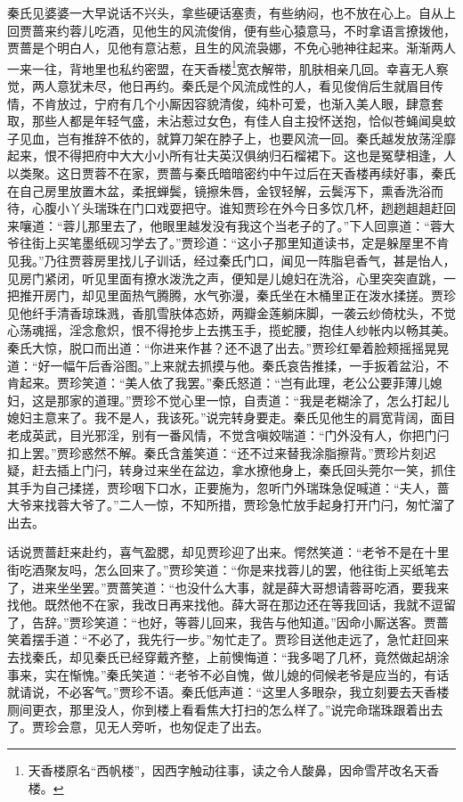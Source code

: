 \documentclass[12pt,oneside]{book}
\begin{document}
秦氏见婆婆一大早说话不兴头，拿些硬话塞责，有些纳闷，也不放在心上。自从上回贾蔷来约蓉儿吃酒，见他生的风流俊俏，便有些心猿意马，不时拿语言撩拨他，贾蔷是个明白人，见他有意沾惹，且生的风流袅娜，不免心驰神往起来。渐渐两人一来一往，背地里也私约密盟，在天香楼\footnote{天香楼原名“西帆楼”，因西字触动往事，读之令人酸鼻，因命雪芹改名天香楼。}宽衣解带，肌肤相亲几回。幸喜无人察觉，两人意犹未尽，他日再约。秦氏是个风流成性的人，看见俊俏后生就眉目传情，不肯放过，宁府有几个小厮因容貌清俊，纯朴可爱，也渐入美人眼，肆意套取，那些人都是年轻气盛，未沾惹过女色，有佳人自主投怀送抱，恰似苍蝇闻臭蚊子见血，岂有推辞不依的，就算刀架在脖子上，也要风流一回。秦氏越发放荡淫靡起来，恨不得把府中大大小小所有壮夫英汉俱纳归石榴裙下。这也是冤孽相逢，人以类聚。这日贾蓉不在家，贾蔷与秦氏暗暗密约中午过后在天香楼再续好事，秦氏在自己房里放置木盆，柔抿蝉鬓，镜擦朱唇，金钗轻解，云鬓泻下，熏香洗浴而待，心腹小丫头瑞珠在门口戏耍把守。谁知贾珍在外今日多饮几杯，趔趔趄趄赶回来嚷道：“蓉儿那里去了，他眼里越发没有我这个当老子的了。”下人回禀道：“蓉大爷往街上买笔墨纸砚习学去了。”贾珍道：“这小子那里知道读书，定是躲屋里不肯见我。”乃往贾蓉房里找儿子训话，经过秦氏门口，闻见一阵脂皂香气，甚是怡人，见房门紧闭，听见里面有撩水泼洗之声，便知是儿媳妇在洗浴，心里突突直跳，一把推开房门，却见里面热气腾腾，水气弥漫，秦氏坐在木桶里正在泼水揉搓。贾珍见他纤手清香琼珠溅，香肌雪肤体态娇，两瓣金莲躺床脚，一袭云纱倚枕头，不觉心荡魂摇，淫念愈炽，恨不得抢步上去携玉手，揽蛇腰，抱佳人纱帐内以畅其美。秦氏大惊，脱口而出道：“你进来作甚？还不退了出去。”贾珍红晕着脸颊摇摇晃晃道：“好一幅午后香浴图。”上来就去抓摸与他。秦氏哀告推揉，一手扳着盆沿，不肯起来。贾珍笑道：“美人依了我罢。”秦氏怒道：“岂有此理，老公公要菲薄儿媳妇，这是那家的道理。”贾珍不觉心里一惊，自责道：“我是老糊涂了，怎么打起儿媳妇主意来了。我不是人，我该死。”说完转身要走。秦氏见他生的肩宽背阔，面目老成英武，目光邪淫，别有一番风情，不觉含嗔姣喘道：“门外没有人，你把门闩扣上罢。”贾珍惑然不解。秦氏含羞笑道：“还不过来替我涂脂擦背。”贾珍片刻迟疑，赶去插上门闩，转身过来坐在盆边，拿水撩他身上，秦氏回头莞尔一笑，抓住其手为自己揉搓，贾珍咽下口水，正要施为，忽听门外瑞珠急促喊道：“夫人，蔷大爷来找蓉大爷了。”二人一惊，不知所措，贾珍急忙放手起身打开门闩，匆忙溜了出去。

话说贾蔷赶来赴约，喜气盈腮，却见贾珍迎了出来。愕然笑道：“老爷不是在十里街吃酒聚友吗，怎么回来了。”贾珍笑道：“你是来找蓉儿的罢，他往街上买纸笔去了，进来坐坐罢。”贾蔷笑道：“也没什么大事，就是薛大哥想请蓉哥吃酒，要我来找他。既然他不在家，我改日再来找他。薛大哥在那边还在等我回话，我就不逗留了，告辞。”贾珍笑道：“也好，等蓉儿回来，我告与他知道。”因命小厮送客。贾蔷笑着摆手道：“不必了，我先行一步。”匆忙走了。贾珍目送他走远了，急忙赶回来去找秦氏，却见秦氏已经穿戴齐整，上前懊悔道：“我多喝了几杯，竟然做起胡涂事来，实在惭愧。”秦氏笑道：“老爷不必自愧，做儿媳的伺候老爷是应当的，有话就请说，不必客气。”贾珍不语。秦氏低声道：“这里人多眼杂，我立刻要去天香楼厕间更衣，那里没人，你到楼上看看焦大打扫的怎么样了。”说完命瑞珠跟着出去了。贾珍会意，见无人旁听，也匆促走了出去。
\end{document}
